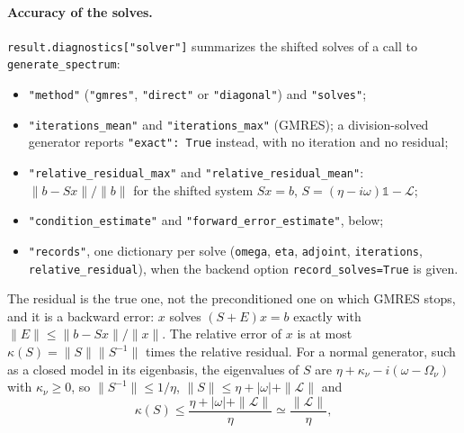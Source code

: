 \documentclass[11pt]{article}
\begin{document}
\paragraph{Accuracy of the solves.}
\label{sec:solve-accuracy}
\texttt{result.diagnostics["solver"]} summarizes the shifted solves of a call to \texttt{generate\_spectrum}:
\begin{itemize}
    \item \texttt{"method"} (\texttt{"gmres"}, \texttt{"direct"} or \texttt{"diagonal"}) and \texttt{"solves"};
    \item \texttt{"iterations\_mean"} and \texttt{"iterations\_max"} (GMRES); a division-solved generator reports \texttt{"exact": True} instead, with no iteration and no residual;
    \item \texttt{"relative\_residual\_max"} and \texttt{"relative\_residual\_mean"}: $\|b-Sx\|/\|b\|$ for the shifted system $Sx=b$, $S=(\eta-i\omega)\mathbb{1}-\mathcal{L}$;
    \item \texttt{"condition\_estimate"} and \texttt{"forward\_error\_estimate"}, below;
    \item \texttt{"records"}, one dictionary per solve (\texttt{omega}, \texttt{eta}, \texttt{adjoint}, \texttt{iterations}, \texttt{relative\_residual}), when the backend option \texttt{record\_solves=True} is given.
\end{itemize}
The residual is the true one, not the preconditioned one on which GMRES stops, and it is a backward error: $x$ solves $(S+E)x=b$ exactly with $\|E\|\leq\|b-Sx\|/\|x\|$. The relative error of $x$ is at most $\kappa(S)=\|S\|\|S^{-1}\|$ times the relative residual. For a normal generator, such as a closed model in its eigenbasis, the eigenvalues of $S$ are $\eta+\kappa_\nu-i(\omega-\Omega_\nu)$ with $\kappa_\nu\geq0$, so $\|S^{-1}\|\leq1/\eta$, $\|S\|\leq\eta+|\omega|+\|\mathcal{L}\|$ and
\begin{equation}
    \kappa(S)\leq\frac{\eta+|\omega|+\|\mathcal{L}\|}{\eta}\simeq\frac{\|\mathcal{L}\|}{\eta},
\end{equation}
\end{document}
